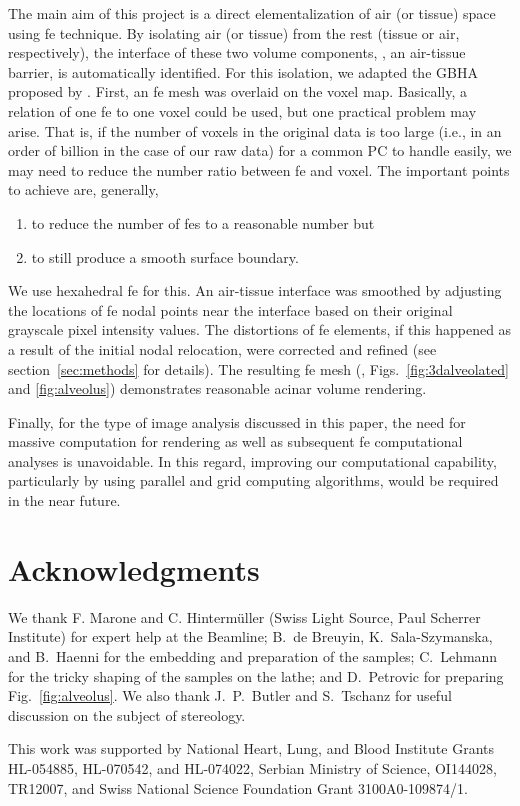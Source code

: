 The main aim of this project is a direct elementalization of air (or tissue) space using \ac{fe} technique. By isolating air (or tissue) from the rest (tissue or air, respectively), the interface of these two volume components, \ie, an air-tissue barrier, is automatically identified. For this isolation, we adapted the \ac{GBHA} proposed by \citet{Schneiders1996}. First, an \ac{fe} mesh was overlaid on the voxel map. Basically, a relation of one \ac{fe} to one voxel could be used, but one practical problem may arise. That is, if the number of voxels in the original data is too large (i.e., in an order of billion in the case of our raw data) for a common PC to handle easily, we may need to reduce the number ratio between \ac{fe} and voxel. The important points to achieve are, generally, 
\begin{enumerate}
	\item to reduce the number of \ac{fe}s to a reasonable number but
	\item to still produce a smooth surface boundary.
\end{enumerate}
We use hexahedral \ac{fe} for this. An air-tissue interface was smoothed by adjusting the locations of \ac{fe} nodal points near the interface based on their original grayscale pixel intensity values. The distortions of \ac{fe} elements, if this happened as a result of the initial nodal relocation, were corrected and refined (see section~\ref{sec:methods} for details). The resulting \threed \ac{fe} mesh (\eg, Figs.~\ref{fig:3dalveolated} and \ref{fig:alveolus}) demonstrates reasonable acinar volume rendering.

Finally, for the type of image analysis discussed in this paper, the need for massive computation for \threed rendering as well as subsequent \ac{fe} computational analyses is unavoidable. In this regard, improving our computational capability, particularly by using parallel and grid computing algorithms, would be required in the near future.

\section{Acknowledgments}
We thank F. Marone and C. Hintermüller (Swiss Light Source, Paul Scherrer Institute) for expert help at the Beamline; B.\ de Breuyin, K.\ Sala-Szymanska, and B.\ Haenni for the embedding and preparation of the samples; C.\ Lehmann for the tricky shaping of the samples on the lathe; and D.\ Petrovic for preparing Fig.~\ref{fig:alveolus}. We also thank J.\ P.\ Butler and S.\ Tschanz for useful discussion on the subject of stereology.

This work was supported by National Heart, Lung, and Blood Institute Grants HL-054885, HL-070542, and HL-074022, Serbian Ministry of Science, OI144028, TR12007, and Swiss National Science Foundation Grant 3100A0-109874/1.
%
%